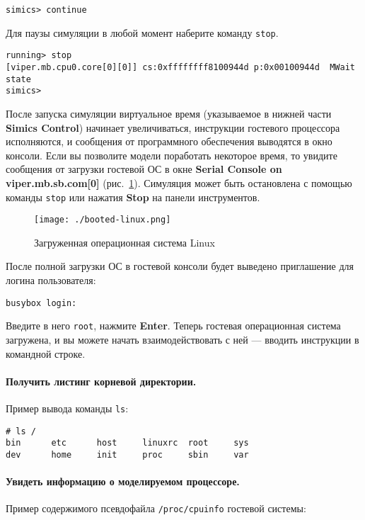 \begin{lstlisting}
simics> continue
\end{lstlisting}

Для паузы симуляции в любой момент наберите команду \texttt{stop}.

\begin{lstlisting}
running> stop
[viper.mb.cpu0.core[0][0]] cs:0xffffffff8100944d p:0x00100944d  MWait state
simics>
\end{lstlisting}

После запуска симуляции виртуальное время (указываемое в нижней части \textbf{Simics Control}) начинает увеличиваться, инструкции гостевого процессора исполняются, и сообщения от программного обеспечения выводятся в окно консоли. Если вы позволите модели поработать некоторое время, то увидите сообщения от загрузки гостевой ОС в окне \textbf{Serial Console on viper.mb.sb.com[0]} (рис.~\ref{fig:booted-linux}). Симуляция может быть остановлена с помощью команды \texttt{stop} или нажатия \textbf{Stop} на панели инструментов.

\begin{figure}
	\centering
	\texttt{[image: ./booted-linux.png]}
	\caption{Загруженная операционная система Linux}
	\label{fig:booted-linux}
\end{figure}

После полной загрузки ОС в гостевой консоли будет выведено приглашение для логина пользователя:
\begin{lstlisting}
busybox login:
\end{lstlisting}

Введите в него \texttt{root}, нажмите \textbf{Enter}. Теперь гостевая операционная система загружена, и вы можете начать взаимодействовать с ней --- вводить инструкции в командной строке.

\paragraph{Получить листинг корневой директории.} Пример вывода команды \texttt{ls}:

\begin{lstlisting}
# ls /
bin      etc      host     linuxrc  root     sys
dev      home     init     proc     sbin     var
\end{lstlisting}

\paragraph{Увидеть информацию о моделируемом процессоре.} Пример содержимого псевдофайла \texttt{/proc/cpuinfo} гостевой системы:

